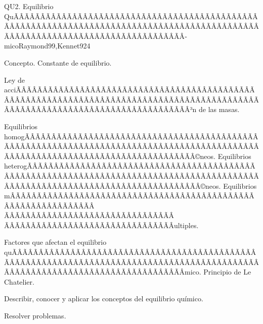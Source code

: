 \begin{sumilla}
\begin{unit}{QU2. Equilibrio QuÃÂÃÂÃÂÃÂÃÂÃÂÃÂÃÂÃÂÃÂÃÂÃÂÃÂÃÂÃÂÃÂÃÂÃÂÃÂÃÂÃÂÃÂÃÂÃÂÃÂÃÂÃÂÃÂÃÂÃÂÃÂÃÂÃÂÃÂÃÂÃÂÃÂÃÂÃÂÃÂÃÂÃÂÃÂÃÂÃÂÃÂÃÂÃÂÃÂÃÂÃÂÃÂÃÂÃÂÃÂÃÂÃÂÃÂÃÂÃÂÃÂÃÂÃÂÃÂ­mico}{Raymond99,Kennet92}{4}
\begin{topicos}
      \item Concepto. Constante de equilibrio.
      \item Ley de acciÃÂÃÂÃÂÃÂÃÂÃÂÃÂÃÂÃÂÃÂÃÂÃÂÃÂÃÂÃÂÃÂÃÂÃÂÃÂÃÂÃÂÃÂÃÂÃÂÃÂÃÂÃÂÃÂÃÂÃÂÃÂÃÂÃÂÃÂÃÂÃÂÃÂÃÂÃÂÃÂÃÂÃÂÃÂÃÂÃÂÃÂÃÂÃÂÃÂÃÂÃÂÃÂÃÂÃÂÃÂÃÂÃÂÃÂÃÂÃÂÃÂÃÂÃÂÃÂ³n de las masas.
      \item Equilibrios homogÃÂÃÂÃÂÃÂÃÂÃÂÃÂÃÂÃÂÃÂÃÂÃÂÃÂÃÂÃÂÃÂÃÂÃÂÃÂÃÂÃÂÃÂÃÂÃÂÃÂÃÂÃÂÃÂÃÂÃÂÃÂÃÂÃÂÃÂÃÂÃÂÃÂÃÂÃÂÃÂÃÂÃÂÃÂÃÂÃÂÃÂÃÂÃÂÃÂÃÂÃÂÃÂÃÂÃÂÃÂÃÂÃÂÃÂÃÂÃÂÃÂÃÂÃÂÃÂ©neos. Equilibrios heterogÃÂÃÂÃÂÃÂÃÂÃÂÃÂÃÂÃÂÃÂÃÂÃÂÃÂÃÂÃÂÃÂÃÂÃÂÃÂÃÂÃÂÃÂÃÂÃÂÃÂÃÂÃÂÃÂÃÂÃÂÃÂÃÂÃÂÃÂÃÂÃÂÃÂÃÂÃÂÃÂÃÂÃÂÃÂÃÂÃÂÃÂÃÂÃÂÃÂÃÂÃÂÃÂÃÂÃÂÃÂÃÂÃÂÃÂÃÂÃÂÃÂÃÂÃÂÃÂ©neos. Equilibrios m\ÃÂÃÂÃÂÃÂÃÂÃÂÃÂÃÂÃÂÃÂÃÂÃÂÃÂÃÂÃÂÃÂÃÂÃÂÃÂÃÂÃÂÃÂÃÂÃÂÃÂÃÂÃÂÃÂÃÂÃÂÃÂÃÂÃÂÃÂÃÂÃÂÃÂÃÂÃÂÃÂÃÂÃÂÃÂÃÂÃÂÃÂÃÂÃÂÃÂÃÂÃÂÃÂÃÂÃÂÃÂÃÂÃÂÃÂÃÂÃÂÃÂÃÂÃÂÃÂultiples.
      \item Factores que afectan el equilibrio quÃÂÃÂÃÂÃÂÃÂÃÂÃÂÃÂÃÂÃÂÃÂÃÂÃÂÃÂÃÂÃÂÃÂÃÂÃÂÃÂÃÂÃÂÃÂÃÂÃÂÃÂÃÂÃÂÃÂÃÂÃÂÃÂÃÂÃÂÃÂÃÂÃÂÃÂÃÂÃÂÃÂÃÂÃÂÃÂÃÂÃÂÃÂÃÂÃÂÃÂÃÂÃÂÃÂÃÂÃÂÃÂÃÂÃÂÃÂÃÂÃÂÃÂÃÂÃÂ­mico. Principio de Le Chatelier.
    \end{topicos}
   \begin{objetivos}
      \item Describir, conocer y aplicar los conceptos del equilibrio qu\'imico.
      \item Resolver problemas.
   \end{objetivos}
\end{unit}


\end{sumilla}
